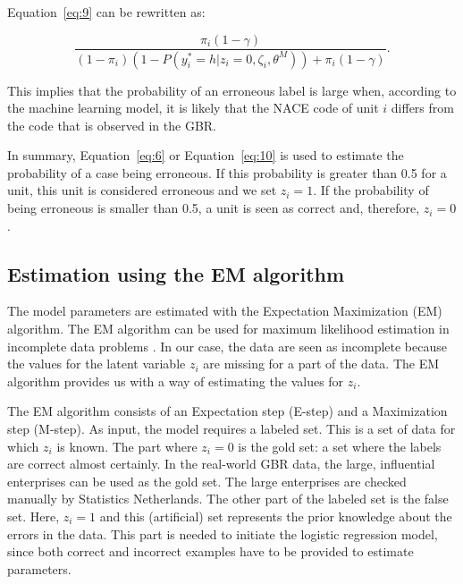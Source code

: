 \documentclass[12pt, a4paper, titlepage]{article}
\begin{document}
Equation~\ref{eq:9} can be rewritten as:

						\begin{equation}\label{eq:10}
\frac{\pi_i (1-\gamma)}{(1-\pi_i)(1-P(y^*_i = h | z_i = 0, \zeta_i, \theta^M)) + \pi_i (1-\gamma)}   .
						\end{equation}


This implies that the probability of an erroneous label is large when, according to the machine learning model, it is likely that the NACE code of unit $i$ differs from the code that is observed in the GBR.

In summary, Equation~\ref{eq:6} or Equation~\ref{eq:10} is used to estimate the probability of a case being erroneous. If this probability is greater than 0.5 for a unit, this unit is considered erroneous and we set $z_i = 1$. If the probability of being erroneous is smaller than 0.5, a unit is seen as correct and, therefore, $z_i=0$.


					\subsection{Estimation using the EM algorithm}
					\label{section:em}

The model parameters are estimated with the Expectation Maximization (EM) algorithm. The EM algorithm can be used for maximum likelihood estimation in incomplete data problems \citep{Rubin}. In our case, the data are seen as incomplete because the values for the latent variable $z_i$ are missing for a part of the data. The EM algorithm provides us with a way of estimating the values for $z_i$.

The EM algorithm consists of an Expectation step (E-step) and a Maximization step (M-step). As input, the model requires a labeled set. This is a set of data for which $z_i$ is known. The part where $z_i=0$ is the gold set: a set where the labels are correct almost certainly. In the real-world GBR data, the large, influential enterprises can be used as the gold set. The large enterprises are checked manually by Statistics Netherlands. The other part of the labeled set is the false set. Here, $z_i = 1$ and this (artificial) set represents the prior knowledge about the errors in the data. This part is needed to initiate the logistic regression model, since both correct and incorrect examples have to be provided to estimate parameters. 
\end{document}
